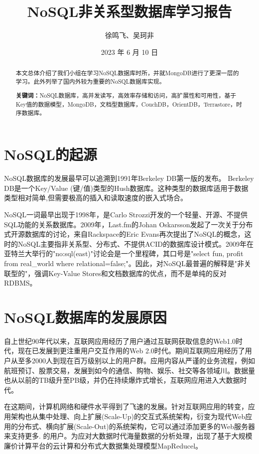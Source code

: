 \documentclass[11pt, a4paper, oneside]{ctexart}
\title{\textbf{NoSQL非关系型数据库学习报告}}
\author{徐鸣飞、吴珂非}
\date{2023 年 6 月 10 日}
\begin{document}
\maketitle
\setcounter{page}{0}
\thispagestyle{empty}
\begin{abstract}
    本文总体介绍了我们小组在学习NoSQL数据库时所，并就MongoDB进行了更深一层的学习。此外列举了国内外较为重要的NoSQL数据库实现。
    \par\textbf{关键词：}NoSQL数据库，高并发读写，高效率存储和访问，高扩展性和可用性，基于Key值的数据模型，MongoDB，文档型数据库，CouchDB，OrientDB，Terrastore，时序数据库。 
\end{abstract}
\newpage
\section{NoSQL的起源}
NoSQL数据库的发展最早可以追溯到1991年Berkeley DB第一版的发布。 Berkeley DB是一个Key/Value (键/值)类型的Hush数据库。这种类型的数据库适用于数据类型相对简单,但需要极高的插入和读取速度的嵌入式场合。\textsuperscript{\cite{ref1}}


NoSQL一词最早出现于1998年，是Carlo Strozzi开发的一个轻量、开源、不提供SQL功能的关系数据库。2009年，Last.fm的Johan Oskarsson发起了一次关于分布式开源数据库的讨论，来自Rackspace的Eric Evans再次提出了NoSQL的概念，这时的NoSQL主要指非关系型、分布式、不提供ACID的数据库设计模式。2009年在亚特兰大举行的"no:sql(east)"讨论会是一个里程碑，其口号是"select fun, profit from real\_world where relational=false;"。因此，对NoSQL最普遍的解释是"非关联型的"，强调Key-Value Stores和文档数据库的优点，而不是单纯的反对RDBMS。

\section{NoSQL数据库的发展原因}
自上世纪90年代以来，互联网应用经历了用户通过互联网获取信息的Web1.0时代，现在已发展到更注重用户交互作用的Web 2.0时代。期间互联网应用经历了用户从至多2000人到现在百万级别以上的用户群。应用内容从严谨的业务流程，例如航班预订、股票交易，发展到如今的通信、购物、娱乐、社交等各领域川。数据量也从以前的TB级升至PB级，并仍在持续爆炸式增长，互联网应用进入大数据时代。

在这期间，计算机网络和硬件水平得到了飞速的发展。针对互联网应用的转变，应用架构也从集中处理、向上扩展(Scale-Up)的交互式系统架构，衍变为现代Web应用的分布式、横向扩展(Scale-Out)的系统架构，它可以通过添加更多的Web服务器来支持更多.
的用户。为应对大数据时代海量数据的分析处理，出现了基于大规模廉价计算平台的云计算和分布式大数据集处理模型MapReducel。
\end{document}
